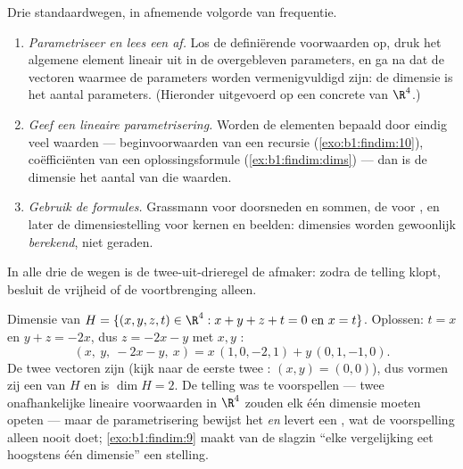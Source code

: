 \begin{method}
\label{met:b1:findim:computedim}
Drie standaardwegen, in afnemende volgorde van frequentie.
\begin{enumerate}
  \item \emph{Parametriseer en lees een  af.} Los de
        definiërende voorwaarden op, druk het algemene element
        lineair uit in de overgebleven parameters, en ga na dat de
        vectoren waarmee de parameters worden vermenigvuldigd 
        zijn: de dimensie is het aantal parameters. (Hieronder
        uitgevoerd op een concrete  van $\R^4$.)
  \item \emph{Geef een  lineaire parametrisering.} Worden
        de elementen bepaald door eindig veel waarden ---
        beginvoorwaarden van een recursie (\cref{exo:b1:findim:10}),
        coëfficiënten van een oplossingsformule
        (\cref{ex:b1:findim:dims}) --- dan is de dimensie het
        aantal van die waarden.
  \item \emph{Gebruik de formules.} Grassmann voor doorsneden en
        sommen, de  voor , en later de
        dimensiestelling voor kernen en beelden: dimensies worden
        gewoonlijk \emph{berekend}, niet geraden.
\end{enumerate}
In alle drie de wegen is de twee-uit-drieregel de afmaker: zodra de
telling klopt, besluit de vrijheid of de voortbrenging alleen.
\end{method}

\begin{example}
\label{ex:b1:findim:parametrize}
Dimensie van $H = \{(x, y, z, t) \in \R^4 : x + y + z + t = 0
\text{ en } x = t\}$. Oplossen: $t = x$ en $y + z = -2x$, dus $z =
-2x - y$ met $x, y$ :
\[
(x,\ y,\ -2x - y,\ x) = x\,(1, 0, -2, 1) + y\,(0, 1, -1, 0) .
\]
De twee vectoren zijn  (kijk naar de eerste twee :
$(x, y) = (0,0)$), dus vormen zij een  van $H$ en is $\dim H
= 2$. De telling was te voorspellen --- twee onafhankelijke
lineaire voorwaarden in $\R^4$ zouden elk één dimensie moeten
opeten --- maar de parametrisering bewijst het \emph{en} levert een
, wat de voorspelling alleen nooit doet;
\cref{exo:b1:findim:9} maakt van de slagzin ``elke vergelijking
eet hoogstens één dimensie'' een stelling.
\end{example}

